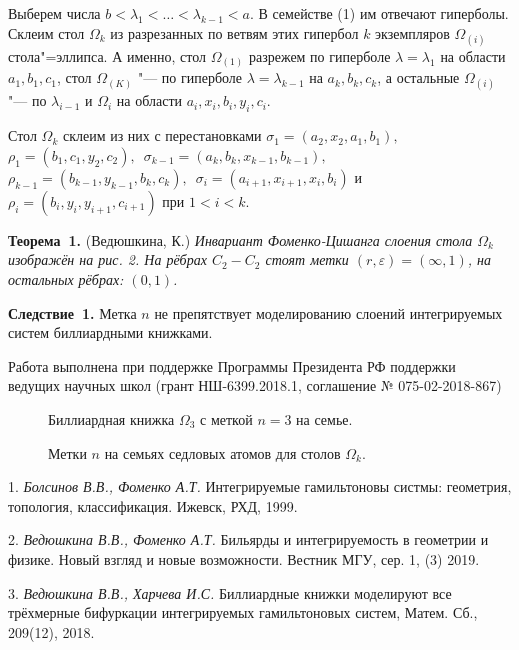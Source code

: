 Выберем числа $b < \lambda_1 < \dots < \lambda_{k-1} < a$. В семействе (1) им отвечают гиперболы. Склеим стол $\Omega_k$ из разрезанных по ветвям этих гипербол $k$ экземпляров $\Omega_{(i)}$ стола"=эллипса. А именно, стол $\Omega_{(1)}$ разрежем по гиперболе $\lambda = \lambda_1$ на области $a_1, b_1, c_1$, стол $\Omega_{(K)}$ "--- по гиперболе $\lambda = \lambda_{k-1}$ на $a_k, b_k, c_k$, а остальные $\Omega_{(i)}$ "--- по $\lambda_{i-1}$ и $\Omega_i$ на области $a_i, x_i, b_i, y_i, c_i$.

Стол $\Omega_k$ склеим из них с перестановками $\sigma_1 = (a_2, x_2, a_1, b_1),$\, $\rho_1 = (b_1, c_1, y_2, c_2),$\, $\sigma_{k-1} = (a_{k}, b_{k}, x_{k-1}, b_{k-1}) ,$\, $\rho_{k-1} = (b_{k-1}, y_{k-1}, b_{k}, c_{k}),$\, $\sigma_i = (a_{i+1}, x_{i+1}, x_i, b_i)$ и $\rho_i = (b_{i}, y_{i}, y_{i+1}, c_{i+1})$ при $1 < i < k$.

\textbf{Теорема~1.} (Ведюшкина, К.) {\it Инвариант Фоменко-Цишанга слоения стола $\Omega_k$ изображён на рис. 2. На рёбрах $C_2 - C_2$ стоят метки $(r, \varepsilon) = (\infty, 1)$, на остальных рёбрах: $(0, 1)$.}

\textbf{Следствие~1.} Метка $n$ не препятствует моделированию слоений интегрируемых систем биллиардными книжками.

Работа выполнена при поддержке Программы Президента РФ поддержки ведущих научных школ (грант НШ-6399.2018.1, соглашение № 075-02-2018-867)




 \begin{figure}[h!]
\caption{Биллиардная книжка $\Omega_3$ с меткой $n = 3$ на семье.} \label{WildMol}
 \end{figure}


 \begin{figure}[h!]
\caption{Метки $n$ на семьях седловых атомов для столов $\Omega_k$.} \label{WildMol}
 \end{figure}









\litlist

1. {\it Болсинов В.В., Фоменко А.Т.} Интегрируемые гамильтоновы систмы: геометрия, топология, классификация. Ижевск, РХД, 1999.


2. {\it Ведюшкина В.В., Фоменко А.Т.} Бильярды и интегрируемость в геометрии и физике. Новый взгляд и новые возможности. Вестник МГУ, сер. 1, (3) 2019.

3. {\it Ведюшкина В.В., Харчева И.С.} Биллиардные книжки моделируют все трёхмерные бифуркации интегрируемых гамильтоновых систем, Матем. Сб., 209(12), 2018.

